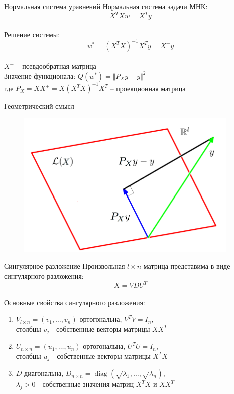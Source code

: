 \documentclass[10pt]{beamer}
\begin{document}
\begin{frame}{Нормальная система уравнений}
	Нормальная система задачи МНК:
	$$X^T X w = X^T y$$\\
	\pause
	Решение системы:\\
	$$w^* = (X^T X)^{-1} X^T y = X^{+} y$$\\
	$X^{+}$ -- псевдообратная матрица\\
	\bigbreak
	\pause
	Значение функционала: $Q(w^*) = \Vert P_X y - y \Vert^2$\\
	\bigbreak
	где $P_X = X X^{+} = X(X^T X)^{-1} X^T$ -- проекционная матрица
\end{frame}

\begin{frame}{Геометрический смысл}
	\begin{figure}[htbp]
	  \includegraphics[height=200pt, keepaspectratio = true]{images/geometry}   
	\end{figure}
\end{frame}

{
\begin{frame}{Сингулярное разложение}
	Произвольная $l \times n$-матрица представима в виде сингулярного разложения:\\
	$$X = VDU^T$$\\
	\bigbreak
	\pause
	Основные свойства сингулярного разложения:\\
	\begin{enumerate}[--]
		\item $V_{l \times n} = (v_1, \dots, v_n)$ ортогональна, $V^TV = I_n$, \\столбцы $v_j$ - собственные векторы матрицы $XX^T$
		\item $U_{n \times n} = (u_1, \dots, u_n)$ ортогональна, $U^TU = I_n$, \\столбцы $u_j$ - собственные векторы матрицы $X^TX$
		\item $D$ диагональна, $D_{n \times n} = \operatorname{diag} (\sqrt{\lambda_1}, \dots, \sqrt{\lambda_n})$, \\$\lambda_j > 0$ - собственные значения матриц $X^TX$ и $XX^T$
	\end{enumerate}
\end{frame}
}
\end{document}

